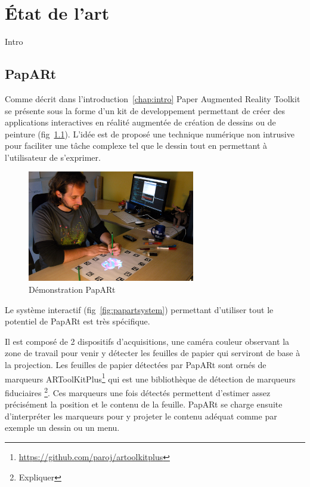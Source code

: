 \chapter{État de l'art}

Intro

\section{PapARt}
Comme décrit dans l'introduction~\ref{chap:intro} Paper Augmented Reality Toolkit se présente sous la forme d'un kit de developpement permettant de créer des applications interactives en réalité augmentée de création de dessins ou de peinture (fig~\ref{fig:papartdemo}). L'idée est de proposé une technique numérique non intrusive pour faciliter une tâche complexe tel que le dessin tout en permettant à l'utilisateur de s'exprimer. %

\begin{figure}[H]
\centering
\includegraphics[width=0.65\textwidth]{images/papart-demo}
\caption{Démonstration PapARt\protect\footnotemark}
\label{fig:papartdemo}
\end{figure}

Le système interactif (fig~\ref{fig:papartsystem}) permettant d'utiliser tout le potentiel de PapARt est très spécifique. 

Il est composé de 2 dispositifs d'acquisitions, une caméra couleur observant la zone de travail pour venir y détecter les feuilles de papier qui serviront de base à la projection. Les feuilles de papier détectées par PapARt sont ornés de marqueurs ARToolKitPlus\footnote{\href{https://github.com/paroj/artoolkitplus}{https://github.com/paroj/artoolkitplus}} qui est une bibliothèque de détection de marqueurs fiduciaires \footnote{Expliquer}. Ces marqueurs une fois détectés permettent d'estimer assez précisément la position et le contenu de la feuille. PapARt se charge ensuite d'interpréter les marqueurs pour y projeter le contenu adéquat comme par exemple un dessin ou un menu.

